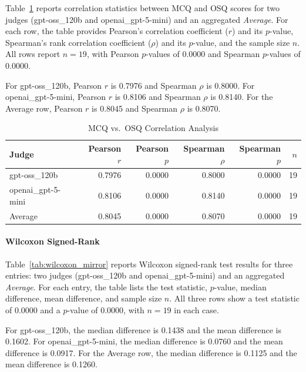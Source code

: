 Table~\ref{tab:mcq_osq_corr_mirror} reports correlation statistics between MCQ and OSQ scores for two judges (gpt-oss\_120b and openai\_gpt-5-mini) and an aggregated \textit{Average}. For each row, the table provides Pearson's correlation coefficient ($r$) and its $p$-value, Spearman's rank correlation coefficient ($\rho$) and its $p$-value, and the sample size $n$. All rows report $n=19$, with Pearson $p$-values of 0.0000 and Spearman $p$-values of 0.0000.

For gpt-oss\_120b, Pearson $r$ is 0.7976 and Spearman $\rho$ is 0.8000. For openai\_gpt-5-mini, Pearson $r$ is 0.8106 and Spearman $\rho$ is 0.8140. For the Average row, Pearson $r$ is 0.8045 and Spearman $\rho$ is 0.8070.


\begin{table}[htbp]
\centering
\caption{MCQ vs.\ OSQ Correlation Analysis}
\label{tab:mcq_osq_corr_mirror}
\begin{tabular}{lrrrrr}
\toprule
Judge & Pearson $r$ & Pearson $p$ & Spearman $\rho$ & Spearman $p$ & $n$ \\
\midrule
gpt-oss\_120b          & 0.7976 & 0.0000 & 0.8000 & 0.0000 & 19 \\
openai\_gpt-5-mini    & 0.8106 & 0.0000 & 0.8140 & 0.0000 & 19 \\
Average               & 0.8045 & 0.0000 & 0.8070 & 0.0000 & 19 \\
\bottomrule
\end{tabular}
\end{table}







\paragraph{Wilcoxon Signed-Rank}

Table~\ref{tab:wilcoxon_mirror} reports Wilcoxon signed-rank test results for three entries: two judges (gpt-oss\_120b and openai\_gpt-5-mini) and an aggregated \textit{Average}. For each entry, the table lists the test statistic, $p$-value, median difference, mean difference, and sample size $n$. All three rows show a test statistic of 0.0000 and a $p$-value of 0.0000, with $n=19$ in each case.

For gpt-oss\_120b, the median difference is 0.1438 and the mean difference is 0.1602. For openai\_gpt-5-mini, the median difference is 0.0760 and the mean difference is 0.0917. For the Average row, the median difference is 0.1125 and the mean difference is 0.1260.

